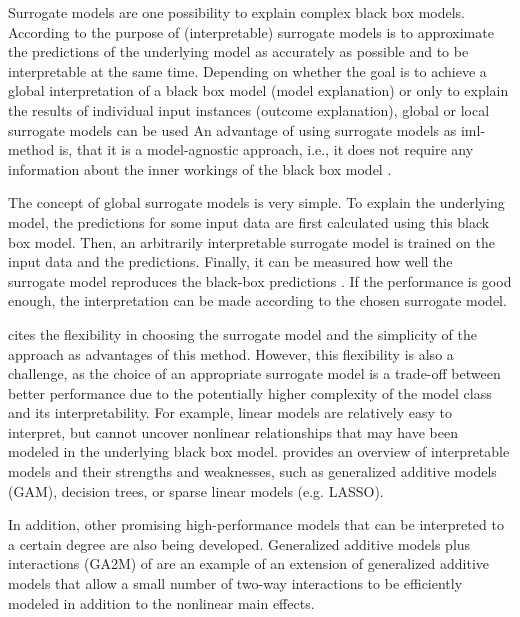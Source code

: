 Surrogate models are one possibility to explain complex black box models. According to \citet{Molnar.2019} the purpose of (interpretable) surrogate models is to approximate the predictions of the underlying model as accurately as possible and to be interpretable at the same time.
Depending on whether the goal is to achieve a global interpretation of a black box model (model explanation) or only to explain the results of individual input instances (outcome explanation), global or local surrogate models can be used \citep{.2021b}
An advantage of using surrogate models as iml-method is, that it is a model-agnostic approach, i.e., it does not require any information about the inner workings of the black box model \citep{Molnar.2019}.


The concept of global surrogate models is very simple. To explain the underlying model, the predictions for some input data are first calculated using this black box model. Then, an arbitrarily interpretable surrogate model is trained on the input data and the predictions. Finally, it can be measured how well the surrogate model reproduces the black-box predictions \citep{Molnar.2019}. If the performance is good enough, the interpretation can be made according to the chosen surrogate model.

\citet{Molnar.2019} cites the flexibility in choosing the surrogate model and the simplicity of the approach as advantages of this method. However, this flexibility is also a challenge, as the choice of an appropriate surrogate model is a trade-off between better performance due to the potentially higher complexity of the model class and its interpretability. For example, linear models are relatively easy to interpret, but cannot uncover nonlinear relationships that may have been modeled in the underlying black box model. \citet{Molnar.2019} provides an overview of interpretable models and their strengths and weaknesses, such as generalized additive models (GAM), decision trees, or sparse linear models (e.g. LASSO). 

In addition, other promising high-performance models that can be interpreted to a certain degree are also being developed. Generalized additive models plus interactions (GA2M) of \citet{Lou.2013} are an example of an extension of generalized additive models that allow a small number of two-way interactions to be efficiently modeled in addition to the nonlinear main effects.


